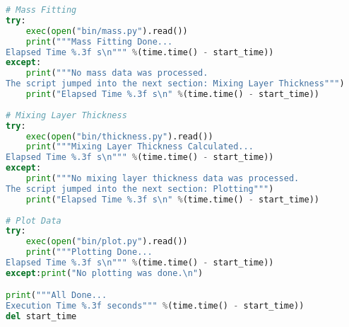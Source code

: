 \begin{lstlisting}[language=python]
# Mass Fitting
try: 
    exec(open("bin/mass.py").read())
    print("""Mass Fitting Done...
Elapsed Time %.3f s\n""" %(time.time() - start_time))
except:
    print("""No mass data was processed.
The script jumped into the next section: Mixing Layer Thickness""")
    print("Elapsed Time %.3f s\n" %(time.time() - start_time))
    
# Mixing Layer Thickness
try: 
    exec(open("bin/thickness.py").read())
    print("""Mixing Layer Thickness Calculated...
Elapsed Time %.3f s\n""" %(time.time() - start_time))
except:
    print("""No mixing layer thickness data was processed.
The script jumped into the next section: Plotting""")
    print("Elapsed Time %.3f s\n" %(time.time() - start_time))
    
# Plot Data
try:
    exec(open("bin/plot.py").read())
    print("""Plotting Done...
Elapsed Time %.3f s\n""" %(time.time() - start_time))
except:print("No plotting was done.\n")

print("""All Done...
Execution Time %.3f seconds""" %(time.time() - start_time))
del start_time

\end{lstlisting}
